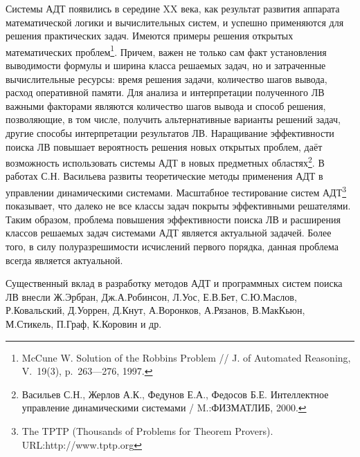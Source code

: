 \documentclass[a4paper]{report}
\begin{document}

Системы АДТ появились в середине XX века, как результат развития аппарата математической логики и вычислительных систем, и успешно применяются для решения практических задач. Имеются примеры решения открытых математических проблем\footnote{McCune W. Solution of the Robbins Problem // J. of Automated Reasoning, V.~19(3), p.~263---276, 1997.}. Причем, важен не только сам факт установления выводимости формулы и ширина класса решаемых задач, но и затраченные вычислительные ресурсы: время решения задачи, количество шагов вывода, расход оперативной памяти. Для анализа и интерпретации полученного ЛВ важными факторами являются количество шагов вывода и способ решения, позволяющие, в том числе, получить альтернативные варианты решений задач, другие способы интерпретации результатов ЛВ. Наращивание эффективности поиска ЛВ повышает вероятность решения новых открытых проблем, даёт возможность использовать системы АДТ в новых предметных областях\footnote{Васильев С.Н., Жерлов А.К., Федунов Е.А., Федосов Б.Е.  Интеллектное управление динамическими системами /  M.:ФИЗМАТЛИБ, 2000.}. В работах С.Н. Васильева развиты теоретические методы применения АДТ в управлении динамическими системами. Масштабное тестирование систем АДТ\footnote{The TPTP (Thousands of Problems for Theorem Provers). URL:http://www.tptp.org} показывает, что далеко не все классы задач покрыты эффективными решателями. Таким образом, проблема повышения эффективности поиска ЛВ и расширения классов решаемых задач системами АДТ является актуальной задачей. Более того, в силу полуразрешимости исчислений первого порядка, данная проблема всегда является актуальной.

Существенный вклад в разработку методов АДТ и программных систем поиска ЛВ внесли Ж.Эрбран, Дж.А.Робинсон, Л.Уос, Е.В.Бет, С.Ю.Маслов, Р.Ковальский, Д.Уоррен, Д.Кнут, А.Воронков, А.Рязанов, В.МакКьюн, М.Сти\-кель, П.Граф, К.Коровин и др. %
\end{document}
